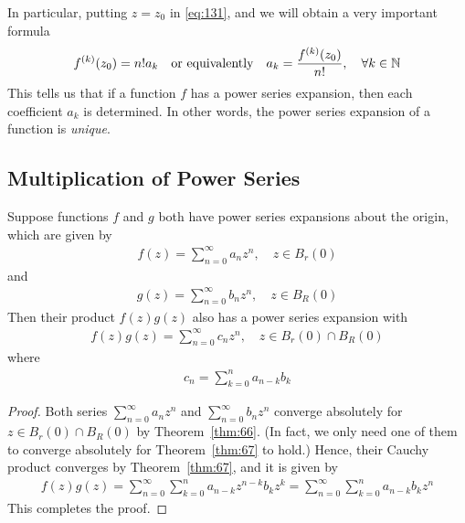 \documentclass[thmcnt=section, 12pt]{my-elegantbook}
\begin{document}
In particular, putting $z = z_0$ in \eqref{eq:131}, and we will obtain a very important formula
\begin{align*}
    f^{(k)} (z_0) = n! a_k
    \quad \text{or equivalently} \quad
    a_k = \frac{f^{(k)}(z_0)}{n!},
    \quad \forall k \in \mathbb{N}
\end{align*}
This tells us that if a function $f$ has a power series expansion, then each coefficient $a_k$ is determined. In other words, the power series expansion of a function is \textit{unique}.


\subsection{Multiplication of Power Series}

\begin{theorem} \label{thm:69}
    Suppose functions $f$ and $g$
    both have power series expansions about the origin,
    which are given by
    \begin{align*}
        f(z) = \sum_{n=0}^\infty a_n z^n,
        \quad z \in B_r(0)
    \end{align*}
    and
    \begin{align*}
        g(z) = \sum_{n=0}^\infty b_n z^n,
        \quad z \in B_R(0)
    \end{align*}
    Then their product $f(z)g(z)$ also has a power series expansion with
    \begin{align*}
        f(z)g(z)
        = \sum_{n=0}^\infty c_n z^n,
        \quad z \in B_r(0) \cap B_R(0)
    \end{align*}
    where
    \begin{align*}
        c_n = \sum_{k=0}^n a_{n-k} b_{k}
    \end{align*}
\end{theorem}

\begin{proof}
    Both series $\sum_{n=0}^\infty a_n z^n$ and $\sum_{n=0}^\infty b_n z^n$ converge absolutely for $z \in B_r(0) \cap B_R(0)$ by Theorem~\ref{thm:66}. (In fact, we only need one of them to converge absolutely for Theorem~\ref{thm:67} to hold.) Hence, their Cauchy product converges by Theorem~\ref{thm:67}, and it is given by
    \begin{align*}
        f(z) g(z)
        = \sum_{n=0}^\infty \sum_{k=0}^n a_{n-k} z^{n-k} b_{k} z^k
        = \sum_{n=0}^\infty \sum_{k=0}^n a_{n-k} b_{k} z^n
    \end{align*}
    This completes the proof.
\end{proof}
\end{document}
